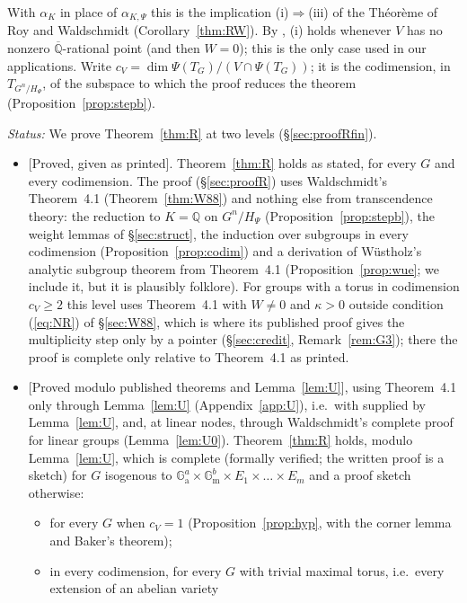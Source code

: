 \documentclass[11pt]{amsart}
\theoremstyle{definition}
\newcommand{\Qb}{\overline{\mathbb{Q}}}
\newcommand{\Q}{\mathbb{Q}}
\newcommand{\Ga}{\mathbb{G}_{\mathrm a}}
\newcommand{\Gm}{\mathbb{G}_{\mathrm m}}
\newcommand{\lab}[1]{\textup{[#1]}}
\newcommand{\LabC}{\lab{Proved modulo published theorems and Lemma~\ref{lem:U}}}
\newcommand{\Status}{\noindent\emph{Status:} }
\begin{document}
\noindent With $\alpha_K$ in place of $\alpha_{K,\Psi}$ this is the implication (i)$\Rightarrow$(iii) of the Th\'eor\`eme of
Roy and Waldschmidt \cite[p.~363]{RW93} (Corollary~\ref{thm:RW}). By \cite[Remarque 1]{RW93}, (i) holds whenever $V$ has no
nonzero $\Qb$-rational point (and then $W=0$); this is the only case used in our applications. Write
$c_V=\dim\Psi(T_G)/(V\cap\Psi(T_G))$; it is the codimension, in $T_{G^n/H_\Psi}$, of the subspace to which the proof
reduces the theorem (Proposition~\ref{prop:stepb}).

\Status{} We prove Theorem~\ref{thm:R} at two levels (\S\ref{sec:proofRfin}).
\begin{itemize}
\item[(R-W)] \lab{Proved, given \cite[Thm.~4.1]{W88} as printed}. Theorem~\ref{thm:R} holds as stated, for every $G$ and
every codimension. The proof (\S\ref{sec:proofR}) uses Waldschmidt's Theorem~4.1 (Theorem~\ref{thm:W88}) and nothing else
from transcendence theory: the reduction to $K=\Q$ on $G^n/H_\Psi$ (Proposition~\ref{prop:stepb}), the weight lemmas of
\S\ref{sec:struct}, the induction over subgroups in every codimension (Proposition~\ref{prop:codim}) and a derivation of
W\"ustholz's analytic subgroup theorem from Theorem~4.1 (Proposition~\ref{prop:wue}; we include it, but it is plausibly
folklore). For groups with a torus in codimension $c_V\ge2$ this level uses Theorem~4.1 with $W\ne0$ and $\kappa>0$
outside condition (\ref{eq:NR}) of \S\ref{sec:W88}, which is where its published proof gives the multiplicity step only by
a pointer (\S\ref{sec:credit}, Remark~\ref{rem:G3}); there the proof is complete only relative to Theorem~4.1 as printed.
\item[(R-P)] \LabC, using Theorem~4.1 only through Lemma~\ref{lem:U} (Appendix~\ref{app:U}), i.e.\ with
\cite[Prop.~6.1]{W88} supplied by Lemma~\ref{lem:U}, and, at linear nodes, through Waldschmidt's complete proof for linear
groups (Lemma~\ref{lem:U0}). Theorem~\ref{thm:R} holds, modulo Lemma~\ref{lem:U}, which is complete (formally verified;
the written proof is a sketch) for $G$ isogenous to $\Ga^{a}\times\Gm^{b}\times E_1\times\dots\times E_m$ and a proof sketch
otherwise:
\begin{itemize}
\item[($\alpha$)] for every $G$ when $c_V=1$ (Proposition~\ref{prop:hyp}, with the corner lemma and Baker's theorem);
\item[($\beta$)] in every codimension, for every $G$ with trivial maximal torus, i.e.\ every extension of an abelian variety

\end{itemize}
\end{itemize}
\end{document}
